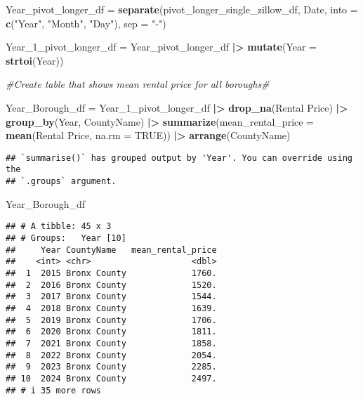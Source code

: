 \documentclass[
]{article}
\newenvironment{Shaded}{\begin{snugshade}}{\end{snugshade}}
\newcommand{\AttributeTok}[1]{\textcolor[rgb]{0.13,0.29,0.53}{#1}}
\newcommand{\CommentTok}[1]{\textcolor[rgb]{0.56,0.35,0.01}{\textit{#1}}}
\newcommand{\ConstantTok}[1]{\textcolor[rgb]{0.56,0.35,0.01}{#1}}
\newcommand{\FunctionTok}[1]{\textcolor[rgb]{0.13,0.29,0.53}{\textbf{#1}}}
\newcommand{\NormalTok}[1]{#1}
\newcommand{\OtherTok}[1]{\textcolor[rgb]{0.56,0.35,0.01}{#1}}
\newcommand{\SpecialCharTok}[1]{\textcolor[rgb]{0.81,0.36,0.00}{\textbf{#1}}}
\newcommand{\StringTok}[1]{\textcolor[rgb]{0.31,0.60,0.02}{#1}}
\begin{document}
\begin{Shaded}
\begin{Highlighting}[]
\NormalTok{Year\_pivot\_longer\_df }\OtherTok{=} \FunctionTok{separate}\NormalTok{(pivot\_longer\_single\_zillow\_df, }
\NormalTok{                                Date, }\AttributeTok{into =} \FunctionTok{c}\NormalTok{(}\StringTok{"Year"}\NormalTok{, }\StringTok{"Month"}\NormalTok{, }\StringTok{"Day"}\NormalTok{), }\AttributeTok{sep =} \StringTok{"{-}"}\NormalTok{)}

\NormalTok{Year\_1\_pivot\_longer\_df }\OtherTok{=}\NormalTok{ Year\_pivot\_longer\_df }\SpecialCharTok{|\textgreater{}} \FunctionTok{mutate}\NormalTok{(}\AttributeTok{Year =} \FunctionTok{strtoi}\NormalTok{(Year))}

\CommentTok{\#Create table that shows mean rental price for all boroughs\#}

\NormalTok{Year\_Borough\_df }\OtherTok{=}\NormalTok{ Year\_1\_pivot\_longer\_df }\SpecialCharTok{|\textgreater{}} \FunctionTok{drop\_na}\NormalTok{(}\StringTok{\textasciigrave{}}\AttributeTok{Rental Price}\StringTok{\textasciigrave{}}\NormalTok{) }\SpecialCharTok{|\textgreater{}} \FunctionTok{group\_by}\NormalTok{(Year, CountyName) }\SpecialCharTok{|\textgreater{}}
  \FunctionTok{summarize}\NormalTok{(}\AttributeTok{mean\_rental\_price =} \FunctionTok{mean}\NormalTok{(}\StringTok{\textasciigrave{}}\AttributeTok{Rental Price}\StringTok{\textasciigrave{}}\NormalTok{, }\AttributeTok{na.rm =} \ConstantTok{TRUE}\NormalTok{)) }\SpecialCharTok{|\textgreater{}} \FunctionTok{arrange}\NormalTok{(CountyName)}
\end{Highlighting}
\end{Shaded}

\begin{verbatim}
## `summarise()` has grouped output by 'Year'. You can override using the
## `.groups` argument.
\end{verbatim}

\begin{Shaded}
\begin{Highlighting}[]
\NormalTok{Year\_Borough\_df}
\end{Highlighting}
\end{Shaded}

\begin{verbatim}
## # A tibble: 45 x 3
## # Groups:   Year [10]
##     Year CountyName   mean_rental_price
##    <int> <chr>                    <dbl>
##  1  2015 Bronx County             1760.
##  2  2016 Bronx County             1520.
##  3  2017 Bronx County             1544.
##  4  2018 Bronx County             1639.
##  5  2019 Bronx County             1706.
##  6  2020 Bronx County             1811.
##  7  2021 Bronx County             1858.
##  8  2022 Bronx County             2054.
##  9  2023 Bronx County             2285.
## 10  2024 Bronx County             2497.
## # i 35 more rows
\end{verbatim}
\end{document}
